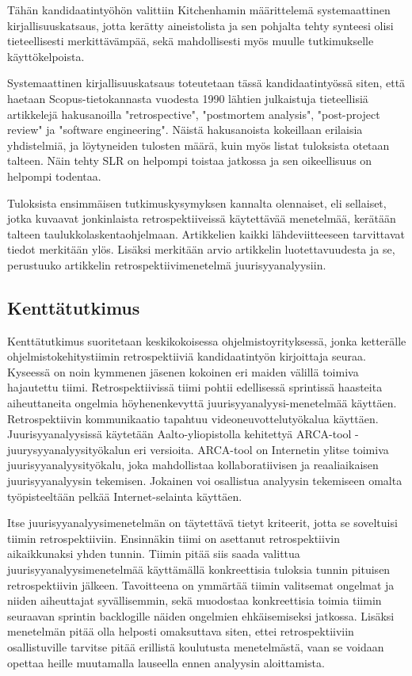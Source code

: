 Tähän kandidaatintyöhön valittiin Kitchenhamin määrittelemä systemaattinen kirjallisuuskatsaus, jotta kerätty aineistolista ja sen pohjalta tehty synteesi olisi tieteellisesti merkittävämpää, sekä mahdollisesti myös muulle tutkimukselle käyttökelpoista.

Systemaattinen kirjallisuuskatsaus toteutetaan tässä kandidaatintyössä siten, että haetaan Scopus-tietokannasta vuodesta 1990 lähtien julkaistuja tieteellisiä artikkelejä hakusanoilla "retrospective",  "postmortem analysis", "post-project review" ja "software engineering". Näistä hakusanoista kokeillaan erilaisia yhdistelmiä, ja löytyneiden tulosten määrä, kuin myös listat tuloksista otetaan talteen. Näin tehty SLR on helpompi toistaa jatkossa ja sen oikeellisuus on helpompi todentaa.

Tuloksista ensimmäisen tutkimuskysymyksen kannalta olennaiset, eli sellaiset, jotka kuvaavat jonkinlaista retrospektiiveissä käytettävää menetelmää, kerätään talteen taulukkolaskentaohjelmaan. Artikkelien kaikki lähdeviitteeseen tarvittavat tiedot merkitään ylös. Lisäksi merkitään arvio artikkelin luotettavuudesta ja se, perustuuko artikkelin retrospektiivimenetelmä juurisyyanalyysiin.


\subsection{Kenttätutkimus}
Kenttätutkimus suoritetaan keskikokoisessa ohjelmistoyrityksessä, jonka ketterälle ohjelmistokehitystiimin retrospektiiviä kandidaatintyön kirjoittaja seuraa. Kyseessä on noin kymmenen jäsenen kokoinen eri maiden välillä toimiva hajautettu tiimi. Retrospektiivissä tiimi pohtii edellisessä sprintissä haasteita aiheuttaneita ongelmia höyhenenkevyttä juurisyyanalyysi-menetelmää käyttäen. Retrospektiivin kommunikaatio tapahtuu videoneuvottelutyökalua käyttäen. Juurisyyanalyysissä käytetään Aalto-yliopistolla kehitettyä ARCA-tool -juurysyyanalyysityökalun \citep{ArcaTool} eri versioita. ARCA-tool on Internetin ylitse toimiva juurisyyanalyysityökalu, joka mahdollistaa kollaboratiivisen ja reaaliaikaisen juurisyyanalyysin tekemisen. Jokainen voi osallistua analyysin tekemiseen omalta työpisteeltään pelkää Internet-selainta käyttäen.

Itse juurisyyanalyysimenetelmän on täytettävä tietyt kriteerit, jotta se soveltuisi tiimin retrospektiiviin. Ensinnäkin tiimi on asettanut retrospektiivin aikaikkunaksi yhden tunnin. Tiimin pitää siis saada valittua juurisyyanalyysimenetelmää käyttämällä konkreettisia tuloksia tunnin pituisen retrospektiivin jälkeen. Tavoitteena on ymmärtää tiimin valitsemat ongelmat ja niiden aiheuttajat syvällisemmin, sekä muodostaa konkreettisia toimia tiimin seuraavan sprintin backlogille näiden ongelmien ehkäisemiseksi jatkossa. Lisäksi menetelmän pitää olla helposti omaksuttava siten, ettei retrospektiiviin osallistuville tarvitse pitää erillistä koulutusta menetelmästä, vaan se voidaan opettaa heille muutamalla lauseella ennen analyysin aloittamista.

